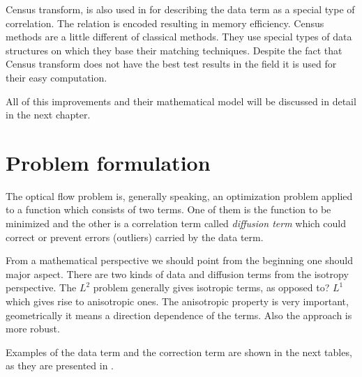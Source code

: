 \documentclass[12pt,a4paper,twoside]{report}
\begin{document}
Census transform, \cite{stein2004efficient} is also used in for describing the data term as a special type of correlation. The relation is encoded resulting in memory efficiency. Census methods are a little different of classical methods. They use special types of data structures on which they base their matching techniques. Despite the fact that Census transform does not have the best test results in the field it is used for their easy computation.

All of this improvements and their mathematical model will be discussed in detail in the next chapter.   

\section{Problem formulation}
The optical flow problem is, generally speaking, an optimization problem applied to a function which consists of two terms. One of them is the function to be minimized and the other is a correlation term called \textit{diffusion term} which could correct or prevent errors (outliers) carried by the data term. 

From a mathematical perspective we should point from the beginning one should major aspect. There are two kinds of data and diffusion terms from the isotropy perspective. The $L^2$ problem generally gives isotropic terms, as opposed to? $L^1$ which gives rise to anisotropic ones. The anisotropic property is very important, geometrically it means a direction dependence of the terms. Also the approach is more robust.

Examples of the data term and the correction term are shown in the next tables,  as they are presented in \cite{trobin}.
\end{document}

